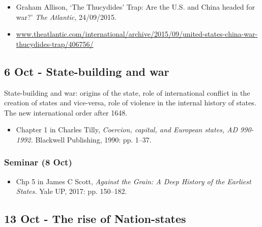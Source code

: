 \documentclass[12pt, a4paper]{article}
\begin{document}
\begin{itemize}
\setlength\itemsep{-5pt}
\item Graham Allison, `The Thucydides' Trap: Are the U.S. and China headed for war?' \textit{The Atlantic,} 24/09/2015.
\item[] \href{https://www.theatlantic.com/international/archive/2015/09/united-states-china-war-thucydides-trap/406756/}{www.theatlantic.com/international/archive/2015/09/united-states-china-war-thucydides-trap/406756/}
\end{itemize}

\subsection*{6 Oct - State-building and war}

State-building and war: origins of the state, role of international conflict in the creation of states and vice-versa, role of violence in the internal history of states. The new international order after 1648.

\begin{itemize}
\setlength\itemsep{0pt}
\item Chapter 1 in Charles Tilly, \textit{Coercion, capital, and European states, AD 990-1992.} Blackwell Publishing, 1990: pp. 1--37.
\end{itemize}

\subsubsection*{Seminar (8 Oct)}

\begin{itemize}
\setlength\itemsep{0pt}
\item Chp 5 in James C Scott, \textit{Against the Grain: A Deep History of the Earliest States.} Yale UP, 2017: pp. 150--182.
\end{itemize}

\subsection*{13 Oct - The rise of Nation-states}
\end{document}
